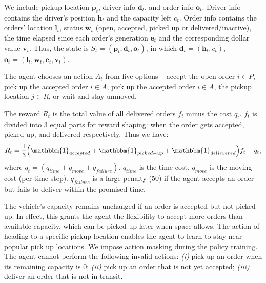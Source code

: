 \documentclass[letterpaper]{article} %
\begin{document}
\begin{description}[style=unboxed,leftmargin=0cm]
	\item [State:] 
	We include pickup location $\mathbf{p}_t$, driver info $\mathbf{d}_t$, and order info $\mathbf{o}_t$. Driver info contains the driver's position $\mathbf{h}_t$ and the capacity left $c_t$. Order info contains the orders' location $\mathbf{l}_t$, status $\mathbf{w}_t$ (open, accepted, picked up or delivered/inactive), the time elapsed since each order's generation $\mathbf{e}_t$ and the corresponding dollar value $\mathbf{v}_t$.  Thus, the state is  $S_t = (\mathbf{p}_t, \mathbf{d}_t, \mathbf{o}_t)$, in which $\mathbf{d}_t = (\mathbf{h}_t, c_t)$, $\mathbf{o}_t = (\mathbf{l}_t, \mathbf{w}_t, \mathbf{e}_t, \mathbf{v}_t)$.
	\item [Action] 
	The agent chooses an action $A_t$ from five options -- accept the open order $i \in P$, pick up the accepted order $i \in A$, pick up the accepted order $i \in A$, the pickup location $j \in R$, or wait and stay unmoved. 
	\item [Reward:] The reward $R_t$ is the total value of all delivered orders $f_t$ minus the cost $q_t$. $f_t$ is divided into $3$ equal parts for reward shaping: when the order gets accepted, picked up, and delivered respectively. Thus we have:
	\begin{equation*}
	R_t = \frac{1}{3}\Big(\mathbbm{1}_{accepted} + \mathbbm{1}_{picked-up} + \mathbbm{1}_{delievered} \Big) f_t - q_t,
	\end{equation*}
	where $q_t = (q_{time} + q_{move} + q_{failure})$. $q_{time}$ is the time cost, $q_{move}$ is the moving cost (per time step). $q_{failure}$ is a large penalty ($50$) if the agent accepts an order but fails to deliver within the promised time. 
	
\end{description}

The vehicle's capacity remains unchanged if an order is accepted but not picked up. In effect, this grants the agent the flexibility to accept more orders than available capacity, which can be picked up later when space allows. The action of heading to a specific pickup location enables the agent to learn to stay near popular pick up locations. %
We impose action masking during the policy training. The agent cannot perform the following invalid actions: \textit{(i)} pick up an order when its remaining capacity is $0$; \textit{(ii)} pick up an order that is not yet accepted; \textit{(iii)} deliver an order that is not in transit. 
\end{document}
